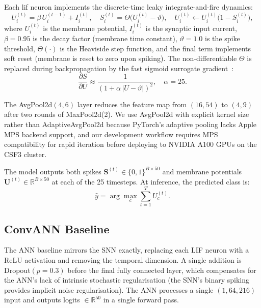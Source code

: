 Each \gls{lif} neuron implements the discrete-time leaky integrate-and-fire dynamics:
\begin{equation}
\label{eq:lif}
U_i^{(t)} = \beta \, U_i^{(t-1)} + I_i^{(t)}, \quad
S_i^{(t)} = \Theta\!\bigl(U_i^{(t)} - \vartheta\bigr), \quad
U_i^{(t)} \leftarrow U_i^{(t)}\bigl(1 - S_i^{(t)}\bigr),
\end{equation}
where $U_i^{(t)}$ is the membrane potential, $I_i^{(t)}$ is the synaptic input current, $\beta = 0.95$ is the decay factor (membrane time constant), $\vartheta = 1.0$ is the spike threshold, $\Theta(\cdot)$ is the Heaviside step function, and the final term implements soft reset (membrane is reset to zero upon spiking). The non-differentiable $\Theta$ is replaced during backpropagation by the fast sigmoid surrogate gradient~\citep{zenke2021remarkable}:
\begin{equation}
\label{eq:surrogate}
\frac{\partial S}{\partial U} \approx \frac{1}{(1 + \alpha\,|U - \vartheta|)^2}, \quad \alpha = 25.
\end{equation}

The AvgPool2d$(4, 6)$ layer reduces the feature map from $(16, 54)$ to $(4, 9)$ after two rounds of MaxPool2d(2). We use AvgPool2d with explicit kernel size rather than AdaptiveAvgPool2d because PyTorch's adaptive pooling lacks Apple MPS backend support, and our development workflow requires MPS compatibility for rapid iteration before deploying to NVIDIA A100 GPUs on the CSF3 cluster.

The model outputs both spikes $\mathbf{S}^{(t)} \in \{0, 1\}^{B \times 50}$ and membrane potentials $\mathbf{U}^{(t)} \in \mathbb{R}^{B \times 50}$ at each of the 25 timesteps. At inference, the predicted class is:
\begin{equation}
\label{eq:prediction}
\hat{y} = \arg\max_c \sum_{t=1}^{T} U_c^{(t)}.
\end{equation}

\subsection{ConvANN Baseline}
\label{ssec:ann-architecture}

The ANN baseline mirrors the SNN exactly, replacing each LIF neuron with a ReLU activation and removing the temporal dimension. A single addition is Dropout$(p = 0.3)$ before the final fully connected layer, which compensates for the ANN's lack of intrinsic stochastic regularisation (the SNN's binary spiking provides implicit noise regularisation). The ANN processes a single $(1, 64, 216)$ input and outputs logits $\in \mathbb{R}^{50}$ in a single forward pass.

